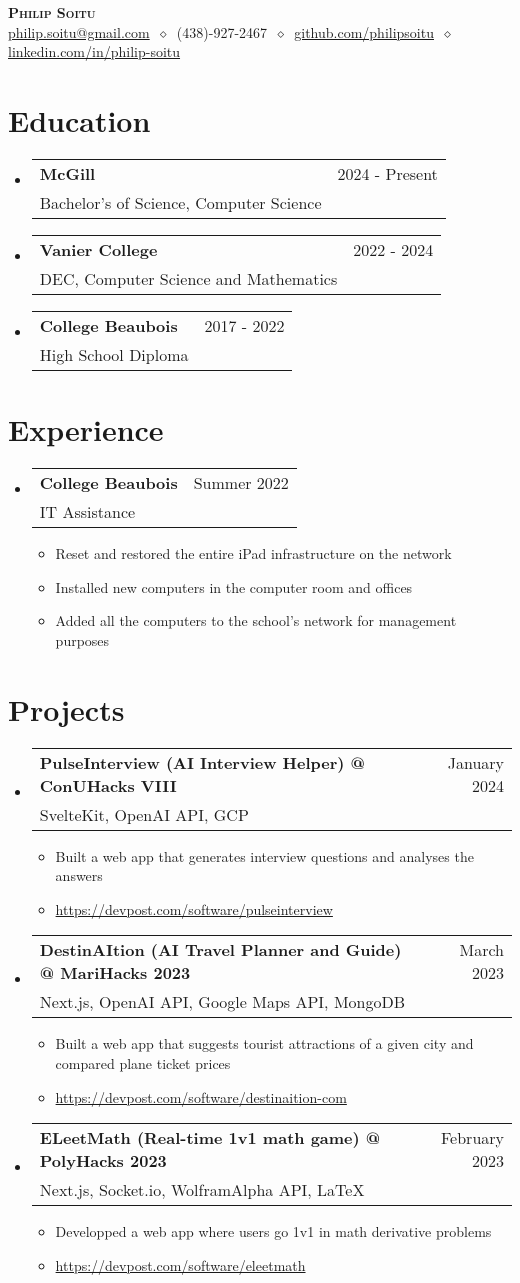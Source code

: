 \documentclass[letterpaper,11pt]{article}
\makeatletter
\newcommand{\cvitem}[1]{
  \item\small{
    {#1\vspace{-2pt}}
  }
}
\newcommand{\cvheading}[4]{
  \vspace{-2pt}\item
    \begin{tabular*}{\textwidth}[t]{l@{\extracolsep{\fill}}r}
      \large\textbf{#1} & #2 \\
      \small#3 & \small #4 \\
    \end{tabular*}\vspace{-7pt}
}
\newcommand{\cvheadingstart}{\begin{itemize}[leftmargin=0in, label={}]}
\newcommand{\cvheadingend}{\end{itemize}}
\newcommand{\cvitemstart}{\begin{itemize}[label=\textopenbullet]\justifying}
\newcommand{\cvitemend}{\end{itemize}\vspace{-5pt}}
\makeatother
\begin{document}
\begin{center}
  \textbf{\LARGE\scshape Philip Soitu} \\
  \vspace{1pt}\small
  \href{mailto:philip.soitu@gmail.com}{philip.soitu@gmail.com}
  $\ \diamond\ $
  (438)-927-2467
  $\ \diamond\ $
  \href{https://github.com/philipsoitu}{github.com/philipsoitu}
  $\ \diamond\ $
  \href{https://www.linkedin.com/in/philip-soitu-7a40a3240/}{linkedin.com/in/philip-soitu}
\end{center}

\section{Education}
\cvheadingstart
  \cvheading
    {McGill}{2024 - Present}
    {Bachelor's of Science, Computer Science}{}
  \cvheading
    {Vanier College}{2022 - 2024}
    {DEC, Computer Science and Mathematics}{}
  \cvheading
    {College Beaubois}{2017 - 2022}
    {High School Diploma}{}
\cvheadingend

\section{Experience}
\cvheadingstart
  \cvheading
    {College Beaubois}{Summer 2022}
    {IT Assistance}{}
  \cvitemstart
    \cvitem{Reset and restored the entire iPad infrastructure on the network}
    \cvitem{Installed new computers in the computer room and offices}
    \cvitem{Added all the computers to the school's network for management purposes}
  \cvitemend
\cvheadingend

\section{Projects}
\cvheadingstart
  \cvheading
    {PulseInterview (AI Interview Helper) @ ConUHacks VIII}{January 2024}
    {SvelteKit, OpenAI API, GCP}{}
  \cvitemstart
    \cvitem{Built a web app that generates interview questions and analyses the answers}
    \cvitem{\href{www.devpost.com/software/pulseinterview}{https://devpost.com/software/pulseinterview}}
  \cvitemend
  \cvheading
    {DestinAItion (AI Travel Planner and Guide) @ MariHacks 2023}{March 2023}
    {Next.js, OpenAI API, Google Maps API, MongoDB}{}
  \cvitemstart
    \cvitem{Built a web app that suggests tourist attractions of a given city and compared plane ticket prices}
    \cvitem{\href{https://devpost.com/software/destinaition-com}{https://devpost.com/software/destinaition-com}}
  \cvitemend
  \cvheading
    {ELeetMath (Real-time 1v1 math game) @ PolyHacks 2023}{February 2023}
    {Next.js, Socket.io, WolframAlpha API, LaTeX}{}
  \cvitemstart
    \cvitem{Developped a web app where users go 1v1 in math derivative problems}
    \cvitem{\href{https://devpost.com/software/eleetmath}{https://devpost.com/software/eleetmath}}
  \cvitemend
\cvheadingend
\end{document}
